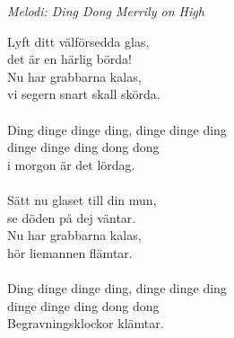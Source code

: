 {\footnotesize\textit{Melodi: Ding Dong Merrily on High}}\par
\vspace{10pt}
Lyft ditt välförsedda glas,\\
det är en härlig börda!\\
Nu har grabbarna kalas,\\
vi segern snart skall skörda.\\
\\
Ding dinge dinge ding, dinge dinge ding\\
dinge dinge ding dong dong\\
i morgon är det lördag.\\
\\
Sätt nu glaset till din mun,\\
se döden på dej väntar.\\
Nu har grabbarna kalas,\\
hör liemannen flämtar.\\
\\
Ding dinge dinge ding, dinge dinge ding\\
dinge dinge ding dong dong\\
Begravningsklockor klämtar.
